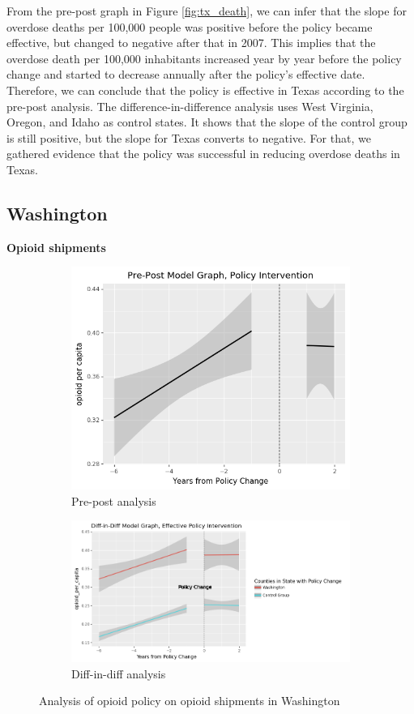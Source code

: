 \documentclass[12pt,letterpaper]{article}
\begin{document}
From the pre-post graph in Figure \ref{fig:tx_death}, we can infer that the slope for overdose deaths per 100,000 people was positive before the policy became effective, but changed to negative after that in 2007. This implies that the overdose death per 100,000 inhabitants increased year by year before the policy change and started to decrease annually after the policy's effective date. Therefore, we can conclude that the policy is effective in Texas according to the pre-post analysis. The difference-in-difference analysis uses West Virginia, Oregon, and Idaho as control states. It shows that the slope of  the control group is still positive, but the slope for Texas converts to negative. For that, we gathered evidence that the policy was successful in reducing overdose deaths in Texas.

\subsection{Washington}
\textbf{Opioid shipments}

\begin{figure}[!h]
\centering
\begin{subfigure}{.5\textwidth}
  \centering
  \includegraphics[width=0.7\linewidth]{../30_results/General_Results/washington_opioid_shipment_prepost.png}
  \caption{Pre-post analysis}
  \label{fig:wa_ship_prepost}
\end{subfigure}%
\begin{subfigure}{.55\textwidth}
  \centering
  \includegraphics[width=1\linewidth]{../30_results/General_Results/washington_opioid_shipment_diffdiff.png}
  \caption{Diff-in-diff analysis}
  \label{fig:wa_ship_did}
\end{subfigure}
\caption{Analysis of opioid policy on opioid shipments in Washington}
\label{fig:wa_ship}
\end{figure}
\end{document}
